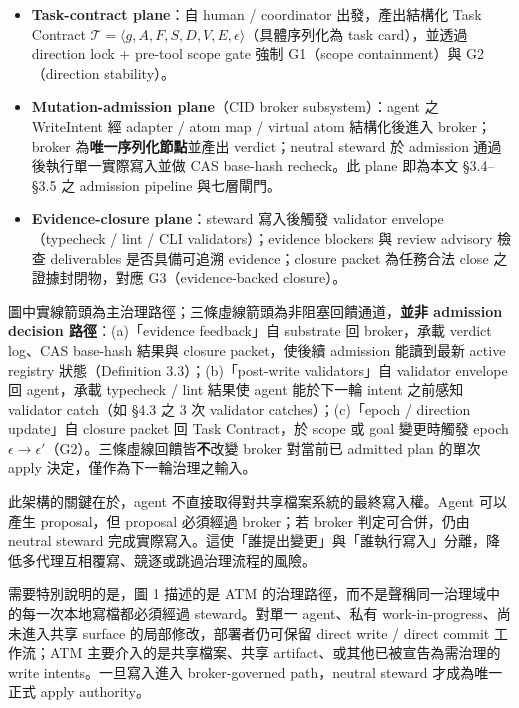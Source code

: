 \documentclass[a4paper,fontset=none]{ctexart}
\begin{document}
\begin{itemize}
\item \textbf{Task-contract plane}：自 human / coordinator 出發，產出結構化 Task Contract $\mathcal{T} = \langle g, A, F, S, D, V, E, \epsilon \rangle$（具體序列化為 task card），並透過 direction lock + pre-tool scope gate 強制 G1（scope containment）與 G2（direction stability）。
\item \textbf{Mutation-admission plane}（CID broker subsystem）：agent 之 WriteIntent 經 adapter / atom map / virtual atom 結構化後進入 broker；broker 為\textbf{唯一序列化節點}並產出 verdict；neutral steward 於 admission 通過後執行單一實際寫入並做 CAS base-hash recheck。此 plane 即為本文 §3.4--§3.5 之 admission pipeline 與七層閘門。
\item \textbf{Evidence-closure plane}：steward 寫入後觸發 validator envelope（typecheck / lint / CLI validators）；evidence blockers 與 review advisory 檢查 deliverables 是否具備可追溯 evidence；closure packet 為任務合法 close 之證據封閉物，對應 G3（evidence-backed closure）。
\end{itemize}

圖中實線箭頭為主治理路徑；三條虛線箭頭為非阻塞回饋通道，\textbf{並非 admission decision 路徑}：(a)「evidence feedback」自 substrate 回 broker，承載 verdict log、CAS base-hash 結果與 closure packet，使後續 admission 能讀到最新 active registry 狀態（Definition 3.3）；(b)「post-write validators」自 validator envelope 回 agent，承載 typecheck / lint 結果使 agent 能於下一輪 intent 之前感知 validator catch（如 §4.3 之 3 次 validator catches）；(c)「epoch / direction update」自 closure packet 回 Task Contract，於 scope 或 goal 變更時觸發 epoch $\epsilon \to \epsilon'$（G2）。三條虛線回饋皆\textbf{不}改變 broker 對當前已 admitted plan 的單次 apply 決定，僅作為下一輪治理之輸入。

此架構的關鍵在於，agent 不直接取得對共享檔案系統的最終寫入權。Agent 可以產生 proposal，但 proposal 必須經過 broker；若 broker 判定可合併，仍由 neutral steward 完成實際寫入。這使「誰提出變更」與「誰執行寫入」分離，降低多代理互相覆寫、競逐或跳過治理流程的風險。

需要特別說明的是，圖 1 描述的是 ATM 的治理路徑，而不是聲稱同一治理域中的每一次本地寫檔都必須經過 steward。對單一 agent、私有 work-in-progress、尚未進入共享 surface 的局部修改，部署者仍可保留 direct write / direct commit 工作流；ATM 主要介入的是共享檔案、共享 artifact、或其他已被宣告為需治理的 write intents。一旦寫入進入 broker-governed path，neutral steward 才成為唯一正式 apply authority。
\end{document}
